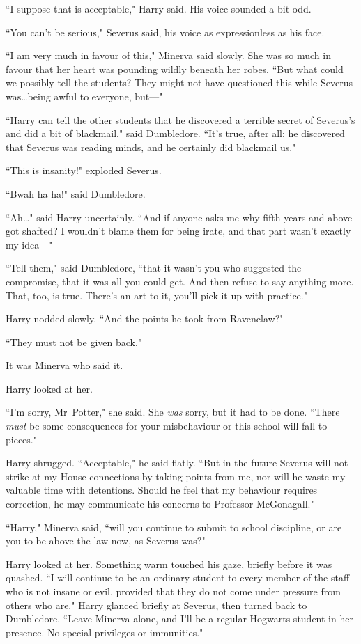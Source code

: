 ``I suppose that is acceptable," Harry said. His voice sounded a bit odd.

``You can't be serious," Severus said, his voice as expressionless as his face.

``I am very much in favour of this," Minerva said slowly. She was so much in favour that her heart was pounding wildly beneath her robes. ``But what could we possibly tell the students? They might not have questioned this while Severus was…being awful to everyone, but—"

``Harry can tell the other students that he discovered a terrible secret of Severus's and did a bit of blackmail," said Dumbledore. ``It's true, after all; he discovered that Severus was reading minds, and he certainly did blackmail us."

``This is insanity!" exploded Severus.

``Bwah ha ha!" said Dumbledore.

``Ah…" said Harry uncertainly. ``And if anyone asks me why fifth-years and above got shafted? I wouldn't blame them for being irate, and that part wasn't exactly my idea—"

``Tell them," said Dumbledore, ``that it wasn't you who suggested the compromise, that it was all you could get. And then refuse to say anything more. That, too, is true. There's an art to it, you'll pick it up with practice."

Harry nodded slowly. ``And the points he took from Ravenclaw?"

``They must not be given back."

It was Minerva who said it.

Harry looked at her.

``I'm sorry, Mr~Potter," she said. She \emph{was} sorry, but it had to be done. ``There \emph{must} be some consequences for your misbehaviour or this school will fall to pieces."

Harry shrugged. ``Acceptable," he said flatly. ``But in the future Severus will not strike at my House connections by taking points from me, nor will he waste my valuable time with detentions. Should he feel that my behaviour requires correction, he may communicate his concerns to Professor McGonagall."

``Harry," Minerva said, ``will you continue to submit to school discipline, or are you to be above the law now, as Severus was?"

Harry looked at her. Something warm touched his gaze, briefly before it was quashed. ``I will continue to be an ordinary student to every member of the staff who is not insane or evil, provided that they do not come under pressure from others who are." Harry glanced briefly at Severus, then turned back to Dumbledore. ``Leave Minerva alone, and I'll be a regular Hogwarts student in her presence. No special privileges or immunities."

